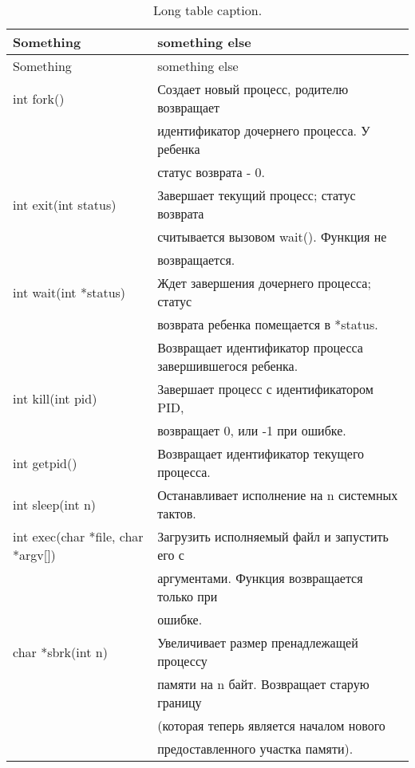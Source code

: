 \begin{longtable}[c]{l|l}
  \caption{Long table caption.\label{long}}\\

  \hline
  Something & something else\\
  \hline\hline
  \endfirsthead

  \hline
  Something & something else\\
  \hline
  \endhead

  \hline
  \endfoot


int fork() & Создает новый процесс, родителю возвращает \\
           & идентификатор дочернего процесса. У ребенка \\
           & статус возврата - 0. \\
\hline
int exit(int status) & Завершает текущий процесс; статус возврата \\
                     & считывается вызовом wait(). Функция не \\
                     & возвращается. \\
\hline
int wait(int *status) & Ждет завершения дочернего процесса; статус \\
                      & возврата ребенка помещается в *status. \\
                      & Возвращает идентификатор процесса завершившегося ребенка. \\
\hline
int kill(int pid) & Завершает процесс с идентификатором PID, \\
                  & возвращает 0, или -1 при ошибке. \\
\hline
int getpid() & Возвращает идентификатор текущего процесса. \\
\hline
int sleep(int n) & Останавливает исполнение на n системных тактов. \\
\hline
int exec(char *file, char *argv[]) & Загрузить исполняемый файл и запустить его с \\
                                   & аргументами. Функция возвращается только при \\
                                   & ошибке. \\
\hline
char *sbrk(int n) & Увеличивает размер пренадлежащей процессу \\
                  & памяти на n байт. Возвращает старую границу \\
                  & (которая теперь является началом нового \\
                  & предоставленного участка памяти). \\

\end{longtable}
